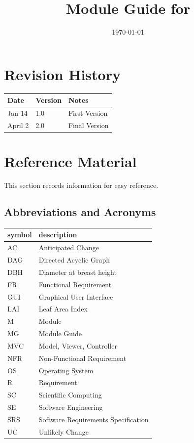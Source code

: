 \documentclass[12pt, titlepage]{article}
\begin{document}
\title{Module Guide for \progname{}} 
\author{\authname}
\date{\today}

\maketitle


\section{Revision History}

\begin{tabularx}{\textwidth}{p{3cm}p{2cm}X}
\toprule {\bf Date} & {\bf Version} & {\bf Notes}\\
\midrule
Jan 14 & 1.0 & First Version\\
April 2 & 2.0 & Final Version\\
\bottomrule
\end{tabularx}

\newpage

\section{Reference Material}

This section records information for easy reference.

\subsection{Abbreviations and Acronyms}

\renewcommand{\arraystretch}{1.2}
\begin{tabular}{l l} 
  \toprule		
  \textbf{symbol} & \textbf{description}\\
  \midrule 
  AC & Anticipated Change\\
  DAG & Directed Acyclic Graph \\
  DBH & Diameter at breast height\\
  FR & Functional Requirement\\
  GUI & Graphical User Interface\\
  LAI & Leaf Area Index\\
  M & Module \\
  MG & Module Guide \\
  MVC & Model, Viewer, Controller\\
  NFR & Non-Functional Requirement\\
  OS & Operating System \\
  R & Requirement\\
  SC & Scientific Computing \\
  SE & Software Engineering\\
  SRS & Software Requirements Specification\\
  UC & Unlikely Change \\
  \bottomrule
\end{tabular}\\
\end{document}
